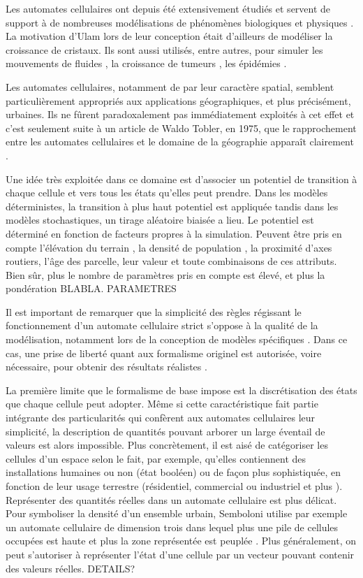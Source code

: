 \documentclass[10pt]{article}
\begin{document}
\begin{multicols}{2}
Les automates cellulaires ont depuis été extensivement étudiés et
servent de support à de nombreuses modélisations de phénomènes
biologiques et physiques \cite{Ganguly}. La motivation d'Ulam lors de
leur conception était d'ailleurs de modéliser la croissance de
cristaux. Ils sont aussi utilisés, entre autres, pour simuler les
mouvements de fluides \cite{Frisch1986}, la croissance de tumeurs
\cite{Kansal2000}, les épidémies \cite{Fu2003}.

Les automates cellulaires, notamment de par leur caractère spatial,
semblent particulièrement appropriés aux applications géographiques,
et plus précisément, urbaines. Ils ne fûrent paradoxalement pas
immédiatement exploités à cet effet et c'est seulement suite à un
article de Waldo Tobler, en 1975, que le rapprochement entre les
automates cellulaires et le domaine de la géographie apparaît
clairement \cite{Tobler1975}.

Une idée très exploitée dans ce domaine est d'associer un potentiel de
transition à chaque cellule et vers tous les états qu'elles peut
prendre. Dans les modèles déterministes, la transition à plus haut
potentiel est appliquée tandis dans les modèles stochastiques, un
tirage aléatoire biaisée a lieu. Le potentiel est déterminé en
fonction de facteurs propres à la simulation. Peuvent être pris en
compte l'élévation du terrain \cite{Semboloni2000}, la densité de
population \cite{}, la proximité d'axes routiers, l'âge des parcelle,
leur valeur et toute combinaisons de ces attributs. Bien sûr, plus le
nombre de paramètres pris en compte est élevé, et plus la pondération
BLABLA. PARAMETRES

Il est important de remarquer que la simplicité des règles régissant
le fonctionnement d'un automate cellulaire strict s'oppose à la
qualité de la modélisation, notamment lors de la conception de modèles
spécifiques \cite{Torrens2001}. Dans ce cas, une prise de liberté
quant aux formalisme originel est autorisée, voire nécessaire, pour
obtenir des résultats réalistes \cite{White1998}.

La première limite que le formalisme de base impose est la
discrétisation des états que chaque cellule peut adopter. Même si
cette caractéristique fait partie intégrante des particularités qui
confèrent aux automates cellulaires leur simplicité, la description de
quantités pouvant arborer un large éventail de valeurs est alors
impossible. Plus concrètement, il est aisé de catégoriser les cellules
d'un espace selon le fait, par exemple, qu'elles contiennent des
installations humaines ou non (état booléen)
\cite{Benguigui2004,Cornu} ou de façon plus sophistiquée, en fonction
de leur usage terrestre (résidentiel, commercial ou industriel
\cite{Lechner} et plus \cite{Dubos-Paillard203}). Représenter des
quantités réelles dans un automate cellulaire est plus délicat. Pour
symboliser la densité d'un ensemble urbain, Semboloni utilise par
exemple un automate cellulaire de dimension trois dans lequel plus une
pile de cellules occupées est haute et plus la zone représentée est
peuplée \cite{Semboloni2000}. Plus généralement, on peut s'autoriser à
représenter l'état d'une cellule par un vecteur pouvant contenir des
valeurs réelles. DETAILS?


\end{multicols}
\end{document}
